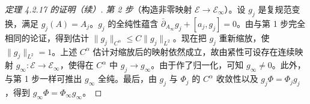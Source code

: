 
\begin{proof}[定理 4.2.17 的证明（续）]
\emph{第 2 步}（构造非零映射 $\mathcal{E}\to\mathcal{E}_\infty$）。设 $g_j$ 是复规范变换，满足 $g_j(A)=A_j$。$g_j$ 的全纯性蕴含 $\bar\partial_{A_\infty}g_j+[a_j,g_j]=0$。由与第 1 步完全相同的论证，得到估计 $\|g_j\|_{C^\alpha}\le C\|g_j\|_{L^2}$。现在把 $g_j$ 重新缩放，使 $\|g_j\|_{L^2}=1$。上述 $C^\alpha$ 估计对缩放后的映射依然成立，故由紧性可设存在连续映射 $g_\infty\colon\mathcal{E}\to\mathcal{E}_\infty$，使得在 $C^\alpha$ 中 $g_j\to g_\infty$。由于作了归一化，可知 $g_\infty\ne0$。此外，与第 1 步一样可推出 $g_\infty$ 全纯。最后，由 $g_j$ 与 $\Phi_j$ 的 $C^\alpha$ 收敛性以及 $g_j\Phi=\Phi_jg_j$，得到 $g_\infty\Phi=\Phi_\infty g_\infty$。


\end{proof}
